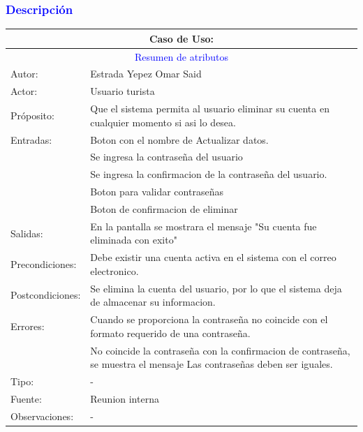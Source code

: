 \subsubsection{\textcolor{blue}{Descripción}}
\begin{tabularx}{16cm}{||l|X||}
	\hline
	\multicolumn{2}{||c||}{Caso de Uso: } \\
	\hline
	\multicolumn{2}{||c||}{\textcolor{blue}{Resumen de atributos}} \\
	\hline
	{Autor:} & Estrada Yepez Omar Said \\
    \hline
	{Actor:} & Usuario turista\\
	\hline
	{Próposito:} & Que el sistema permita al usuario eliminar su cuenta en cualquier momento si asi lo desea.\\
	\hline
	{Entradas:} &  Boton con el nombre de Actualizar datos. \\
    &Se ingresa la contraseña del usuario\\
    &Se ingresa la confirmacion de la contraseña del usuario.\\
    &Boton para validar contraseñas\\
    &Boton de confirmacion de eliminar\\
	\hline
	{Salidas:} & En la pantalla se mostrara el mensaje "Su cuenta fue eliminada con exito"\\
	\hline
	{Precondiciones:} & Debe existir una cuenta activa en el sistema con el correo electronico.\\ 
	\hline
	{Postcondiciones:} & Se elimina la cuenta del usuario, por lo que el sistema deja de almacenar su informacion.\\
	\hline
	{Errores:} & Cuando se proporciona la contraseña no coincide con el formato requerido de una contraseña. \\
    &No coincide la contraseña con la confirmacion de contraseña, se muestra el mensaje Las contraseñas deben ser iguales.\\
	\hline
	{Tipo:} & -\\
	\hline
	{Fuente:} & Reunion interna \\
	\hline
	{Observaciones:} & {-} \\
	\hline
\end{tabularx}

\pagebreak
